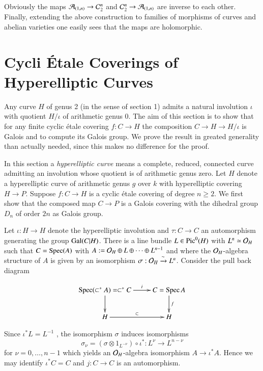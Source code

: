 Obviously the maps $\mathcal{A}_{(1,n)}\rightarrow \mathcal{C}_{2}^{n}$ and $\mathcal{C}_{2}^{n} \rightarrow \mathcal{A}_{(1,n)}$ are inverse to each other. Finally, extending the above construction to families of morphisms of curves and abelian varieties one easily sees that the maps are holomorphic.

\section{Cycli \'Etale Coverings of Hyperelliptic Curves}\label{art11-sec-2}

Any curve $H$ of genus 2 (in the sense of section 1) admits a natural involution $\iota$ with quotient $H/\iota$ of arithmetic genus 0. The aim of this section is to show that for any finite cyclic \'etale covering $f: C\rightarrow H$ the composition $C\rightarrow H\rightarrow H/\iota$ is Galois and to compute its Galois group. We prove the result in greated generality than actually needed, since this makes no difference for the proof.

In this section a \textit{hyperelliptic curve} means a complete, reduced, connected curve admitting an involution whose quotient is of arithmetic genus zero. Let $H$ denote a hyperelliptic curve of arithmetic genus $g$ over $k$ with hyperelliptic covering $H\rightarrow P$. Suppose $f : C\rightarrow H$ is a cyclic \'etale covering of degree $n \geq 2$. We first show that the composed map $C\rightarrow P$ is a Galois covering with the dihedral group $D_{n}$ of order $2n$ as Galois group.

Let $\iota : H \rightarrow H$ denote the hyperelliptic involution and $\tau : C\rightarrow C$ an automorphism generating the group $\operatorname{Gal}(C | H)$. There is a line bundle $L \in \operatorname{Pic}^{0}(H)$ with $L^{n}\simeq \mathcal{O}_{H}$ such that $C = \operatorname{Spec}(A)$ with $A : =\mathcal{O}_{H} \oplus L \oplus \cdots \oplus L^{n-1}$ and where the $\mathcal{O}_{H}$-algebra structure of $A$ is given by an isomorphism $\sigma : \mathcal{O}_{H} \xrightarrow{\sim}L^{n}$. Consider the pull back diagram

$$
\xymatrix{
\Spec(\subset^{*} A)= \subset^{*} C \ar[r]^-{i}\ar[d] & C= \Spec A\ar[d]^-{f}\\ 
H \ar[r]^-{\subset} &  H
}
$$

Since $\iota^{*} L =L^{-1}$ , the isomorphism $\sigma $ induces isomorphisms
$$
\sigma_{\nu} = (\sigma \otimes 1_{L^{-\nu}}) \circ \iota^{*} : L^{\nu} \rightarrow L^{n-\nu}
$$
for $\nu = 0,\ldots,n-1$ which yields an  $\mathcal{O}_{H}$-algebra isomorphism $A \rightarrow \iota^{*}A$.
Hence we may identify $\iota^{*}C =C$ and $j:C \rightarrow C$ is an automorphism.


